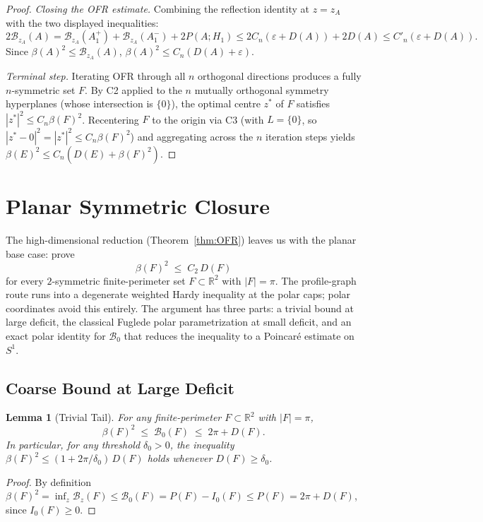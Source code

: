 \documentclass[11pt]{article}
\newtheorem{lemma}[theorem]{Lemma}
\newcommand{\R}{\mathbb{R}}
\newcommand{\B}{\mathcal{B}}
\newcommand{\eps}{\varepsilon}
\begin{document}
\begin{proof}
\smallskip
\emph{Closing the OFR estimate.} Combining the reflection identity at $z = z_A$ with the two displayed inequalities:
\[
  2\B_{z_A}(A) = \B_{z_A}(A_1^+) + \B_{z_A}(A_1^-) + 2P(A;H_1) \le 2C_n(\eps + D(A)) + 2D(A) \le C'_n(\eps + D(A)).
\]
Since $\beta(A)^2 \le \B_{z_A}(A)$, $\beta(A)^2 \le C_n(D(A)+\eps)$.

\smallskip
\emph{Terminal step.} Iterating OFR through all $n$ orthogonal directions produces a fully $n$-symmetric set $F$. By C2 applied to the $n$ mutually orthogonal symmetry hyperplanes (whose intersection is $\{0\}$), the optimal centre $z^*$ of $F$ satisfies $|z^*|^2 \le C_n\beta(F)^2$. Recentering $F$ to the origin via C3 (with $L = \{0\}$, so $|z^* - 0|^2 = |z^*|^2 \le C_n\beta(F)^2$) and aggregating across the $n$ iteration steps yields $\beta(E)^2 \le C_n(D(E) + \beta(F)^2)$. \qedhere
\end{proof}

\section{Planar Symmetric Closure}

The high-dimensional reduction (Theorem~\ref{thm:OFR}) leaves us with the planar base case: prove
\[ \beta(F)^2 \;\le\; C_2\,D(F) \]
for every $2$-symmetric finite-perimeter set $F \subset \R^2$ with $|F|=\pi$. The profile-graph route runs into a degenerate weighted Hardy inequality at the polar caps; polar coordinates avoid this entirely. The argument has three parts: a trivial bound at large deficit, the classical Fuglede polar parametrization at small deficit, and an exact polar identity for $\B_0$ that reduces the inequality to a Poincar\'e estimate on $S^1$.

\subsection{Coarse Bound at Large Deficit}
\begin{lemma}[Trivial Tail] \label{lem:Coarse}
For any finite-perimeter $F\subset\R^2$ with $|F|=\pi$,
\[ \beta(F)^2 \;\le\; \B_0(F) \;\le\; 2\pi + D(F). \]
In particular, for any threshold $\delta_0>0$, the inequality $\beta(F)^2 \le (1+2\pi/\delta_0)\,D(F)$ holds whenever $D(F)\ge \delta_0$.
\end{lemma}
\begin{proof}
By definition $\beta(F)^2 = \inf_z \B_z(F) \le \B_0(F) = P(F) - I_0(F) \le P(F) = 2\pi + D(F)$, since $I_0(F)\ge 0$.
\end{proof}
\end{document}
